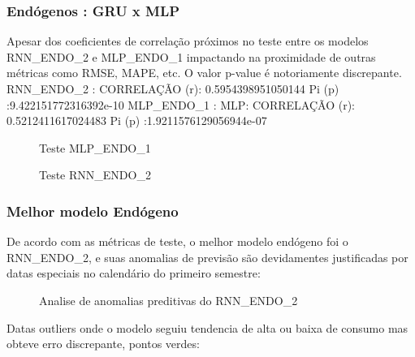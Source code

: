 \documentclass[	12pt, Times, openright, twoside, a4paper, english, brazil]{abntex2}
\begin{document}
    	    \subsubsection{Endógenos : GRU x MLP}
            Apesar dos coeficientes de correlação próximos no teste entre os modelos RNN\_ENDO\_2 e MLP\_ENDO\_1 impactando na proximidade de outras métricas como RMSE, MAPE, etc. O valor p-value é notoriamente discrepante.
            \hline RNN\_ENDO\_2 : CORRELAÇÃO (r): 0.5954398951050144 Pi (p) :9.422151772316392e-10
            \hline MLP\_ENDO\_1 : MLP: CORRELAÇÃO (r): 0.5212411617024483 Pi (p) :1.9211576129056944e-07 
            \begin{figure}[!ht]
              \caption{Teste MLP\_ENDO\_1 \label{fig:case1_mlp_endo1_test} }
            \end{figure}

            \begin{figure}[!ht]
              \caption{Teste RNN\_ENDO\_2 \label{fig:case1_rnn_endo2_test} }
            \end{figure}

    	    \subsubsection{Melhor modelo Endógeno}
            De acordo com as métricas de teste, o melhor modelo endógeno foi o RNN\_ENDO\_2, e suas anomalias de previsão são devidamentes justificadas por datas especiais no calendário do primeiro semestre:
            
            \begin{figure}[!ht]
              \caption{Analise de anomalias preditivas do RNN\_ENDO\_2 \label{fig:case1_rnn_endo2_test_dates} }
            \end{figure}
            Datas outliers onde o modelo seguiu tendencia de alta ou baixa de consumo mas obteve erro discrepante, pontos verdes:
            
\end{document}
